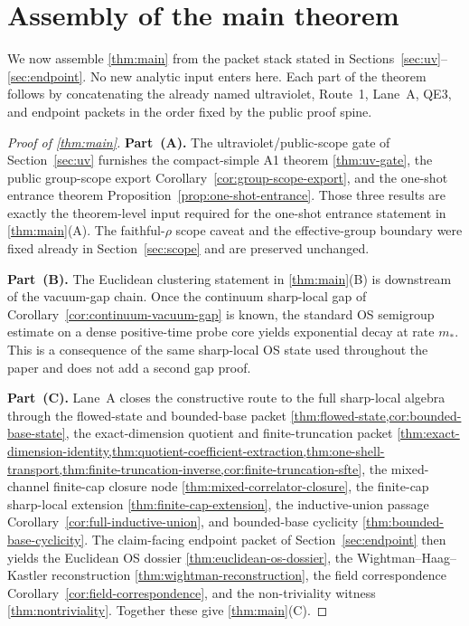 \section{Assembly of the main theorem}\label{sec:assembly}

We now assemble \cref{thm:main} from the packet stack stated in Sections~\ref{sec:uv}--\ref{sec:endpoint}. No new analytic input enters here. Each part of the theorem follows by concatenating the already named ultraviolet, Route~1, Lane~A, QE3, and endpoint packets in the order fixed by the public proof spine.

\begin{proof}[Proof of \cref{thm:main}]
\textbf{Part~(A).} The ultraviolet/public-scope gate of Section~\ref{sec:uv} furnishes the compact-simple A1 theorem \cref{thm:uv-gate}, the public group-scope export Corollary~\ref{cor:group-scope-export}, and the one-shot entrance theorem Proposition~\ref{prop:one-shot-entrance}. Those three results are exactly the theorem-level input required for the one-shot entrance statement in \cref{thm:main}(A). The faithful-$\rho$ scope caveat and the effective-group boundary were fixed already in Section~\ref{sec:scope} and are preserved unchanged.

\textbf{Part~(B).} The Euclidean clustering statement in \cref{thm:main}(B) is downstream of the vacuum-gap chain. Once the continuum sharp-local gap of Corollary~\ref{cor:continuum-vacuum-gap} is known, the standard OS semigroup estimate on a dense positive-time probe core yields exponential decay at rate $m_*$. This is a consequence of the same sharp-local OS state used throughout the paper and does not add a second gap proof.

\textbf{Part~(C).} Lane~A closes the constructive route to the full sharp-local algebra through the flowed-state and bounded-base packet \cref{thm:flowed-state,cor:bounded-base-state}, the exact-dimension quotient and finite-truncation packet \cref{thm:exact-dimension-identity,thm:quotient-coefficient-extraction,thm:one-shell-transport,thm:finite-truncation-inverse,cor:finite-truncation-sfte}, the mixed-channel finite-cap closure node \cref{thm:mixed-correlator-closure}, the finite-cap sharp-local extension \cref{thm:finite-cap-extension}, the inductive-union passage Corollary~\ref{cor:full-inductive-union}, and bounded-base cyclicity \cref{thm:bounded-base-cyclicity}. The claim-facing endpoint packet of Section~\ref{sec:endpoint} then yields the Euclidean OS dossier \cref{thm:euclidean-os-dossier}, the Wightman--Haag--Kastler reconstruction \cref{thm:wightman-reconstruction}, the field correspondence Corollary~\ref{cor:field-correspondence}, and the non-triviality witness \cref{thm:nontriviality}. Together these give \cref{thm:main}(C).


\end{proof}
